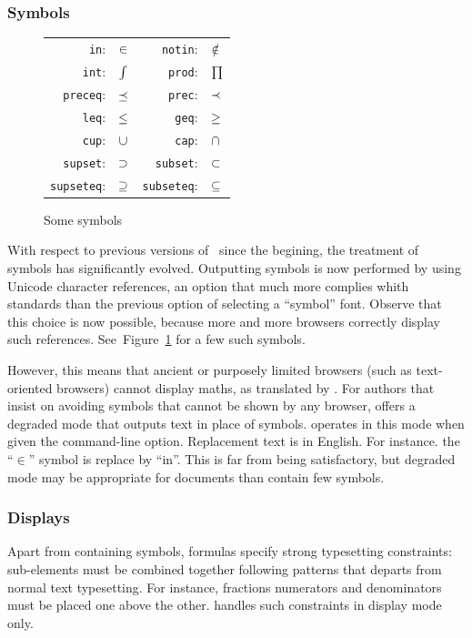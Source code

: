 \subsubsection{Symbols}\label{symbols}
\begin{figure}[ht]
\caption{\label{symbol:fig}Some symbols}
\def\zyva#1{\texttt{\char92{}#1}:\quad & \Large $\csname#1\endcsname$}
\begin{center}
\begin{tabular}{rl@{\qquad}rl}
\zyva{in} & \zyva{notin}\\
\zyva{int} & \zyva{prod}\\
\zyva{preceq} & \zyva{prec}\\
\zyva{leq}    & \zyva{geq}\\
\zyva{cup} & \zyva{cap}\\
\zyva{supset} & \zyva{subset}\\
\zyva{supseteq} & \zyva{subseteq}\\
\end{tabular}
\end{center}
\end{figure}
With respect to previous versions of~\hevea{} since the begining, the
treatment of symbols has significantly evolved.  Outputting symbols is
now performed by using Unicode character references, an option that
much more complies whith standards than the previous option of
selecting a ``symbol'' font.  Observe that this choice is now
possible, because more and more browsers correctly display such
references. See~Figure~\ref{symbol:fig} for a few such symbols.



However, this means that ancient or purposely limited browsers (such as
text-oriented browsers) cannot display maths, as translated by \hevea.
For authors that insist on avoiding symbols that cannot be shown
by any browser, \hevea{} offers a degraded mode that outputs text
in place of symbols.
\hevea{} operates in this mode when given the 
command-line option. Replacement text is in English.
For instance. the ``$\in$'' symbol is replace by ``in''.
This is far from being satisfactory, but degraded mode may be
appropriate for documents than contain few symbols.


\subsubsection{Displays}
Apart from containing symbols, formulas specify strong typesetting
constraints: sub-elements must be combined together following patterns
that departs from normal text typesetting. For instance, fractions
numerators and denominators must be placed one above the other.
\hevea{} handles such constraints in display mode only.



